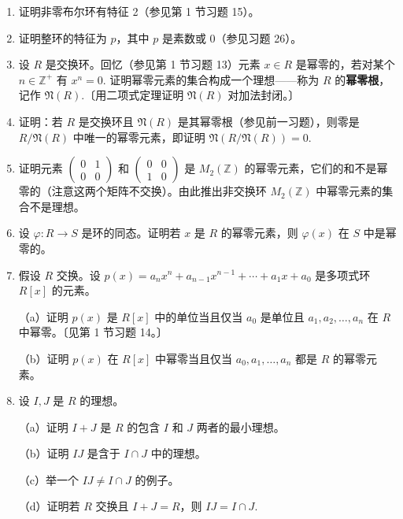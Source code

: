 \begin{enumerate}
\item 证明非零布尔环有特征 2（参见第 1 节习题 15）。

\item 证明整环的特征为 \(p\)，其中 \(p\) 是素数或 0（参见习题 26）。

\item 设 \(R\) 是交换环。回忆（参见第 1 节习题 13）元素 \(x \in R\) 是幂零的，若对某个 \(n \in \mathbb{Z}^+\) 有 \(x^n = 0\). 证明幂零元素的集合构成一个理想——称为 \(R\) 的\textbf{幂零根}，记作 \(\mathfrak{N}(R)\).〔用二项式定理证明 \(\mathfrak{N}(R)\) 对加法封闭。〕

\item 证明：若 \(R\) 是交换环且 \(\mathfrak{N}(R)\) 是其幂零根（参见前一习题），则零是 \(R/\mathfrak{N}(R)\) 中唯一的幂零元素，即证明 \(\mathfrak{N}(R/\mathfrak{N}(R)) = 0\).

\item 证明元素 \(\begin{pmatrix} 0 & 1 \\ 0 & 0 \end{pmatrix}\) 和 \(\begin{pmatrix} 0 & 0 \\ 1 & 0 \end{pmatrix}\) 是 \(M_2(\mathbb{Z})\) 的幂零元素，它们的和不是幂零的（注意这两个矩阵不交换）。由此推出非交换环 \(M_2(\mathbb{Z})\) 中幂零元素的集合不是理想。

\item 设 \(\varphi : R \to S\) 是环的同态。证明若 \(x\) 是 \(R\) 的幂零元素，则 \(\varphi(x)\) 在 \(S\) 中是幂零的。

\item 假设 \(R\) 交换。设 \(p(x) = a_nx^n + a_{n-1}x^{n-1} + \cdots + a_1x + a_0\) 是多项式环 \(R[x]\) 的元素。

（a）证明 \(p(x)\) 是 \(R[x]\) 中的单位当且仅当 \(a_0\) 是单位且 \(a_1, a_2, \ldots, a_n\) 在 \(R\) 中幂零。〔见第 1 节习题 14。〕

（b）证明 \(p(x)\) 在 \(R[x]\) 中幂零当且仅当 \(a_0, a_1, \ldots, a_n\) 都是 \(R\) 的幂零元素。

\item 设 \(I, J\) 是 \(R\) 的理想。

（a）证明 \(I+J\) 是 \(R\) 的包含 \(I\) 和 \(J\) 两者的最小理想。

（b）证明 \(IJ\) 是含于 \(I \cap J\) 中的理想。

（c）举一个 \(IJ \neq I \cap J\) 的例子。

（d）证明若 \(R\) 交换且 \(I+J = R\)，则 \(IJ = I \cap J\).


\end{enumerate}
